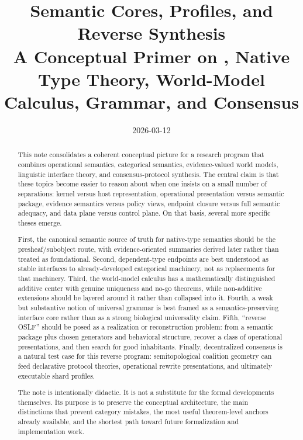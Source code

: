 \documentclass[11pt]{article}
\title{Semantic Cores, Profiles, and Reverse Synthesis\\
\large A Conceptual Primer on \OSLF, Native Type Theory, World-Model Calculus, Grammar, and Consensus}
\author{}
\date{2026-03-12}
\newcommand{\OSLF}{OSLF}
\begin{document}
\maketitle

\begin{abstract}
This note consolidates a coherent conceptual picture for a research program that combines operational semantics, categorical semantics, evidence-valued world models, linguistic interface theory, and consensus-protocol synthesis. The central claim is that these topics become easier to reason about when one insists on a small number of separations: kernel versus host representation, operational presentation versus semantic package, evidence semantics versus policy views, endpoint closure versus full semantic adequacy, and data plane versus control plane. On that basis, several more specific theses emerge.

First, the canonical semantic source of truth for native-type semantics should be the presheaf/subobject route, with evidence-oriented summaries derived later rather than treated as foundational. Second, dependent-type endpoints are best understood as stable interfaces to already-developed categorical machinery, not as replacements for that machinery. Third, the world-model calculus has a mathematically distinguished additive center with genuine uniqueness and no-go theorems, while non-additive extensions should be layered around it rather than collapsed into it. Fourth, a weak but substantive notion of universal grammar is best framed as a semantics-preserving interface core rather than as a strong biological universality claim. Fifth, ``reverse \OSLF'' should be posed as a realization or reconstruction problem: from a semantic package plus chosen generators and behavioral structure, recover a class of operational presentations, and then search for good inhabitants. Finally, decentralized consensus is a natural test case for this reverse program: semitopological coalition geometry can feed declarative protocol theories, operational rewrite presentations, and ultimately executable shard profiles.

The note is intentionally didactic. It is not a substitute for the formal developments themselves. Its purpose is to preserve the conceptual architecture, the main distinctions that prevent category mistakes, the most useful theorem-level anchors already available, and the shortest path toward future formalization and implementation work.
\end{abstract}
\end{document}
